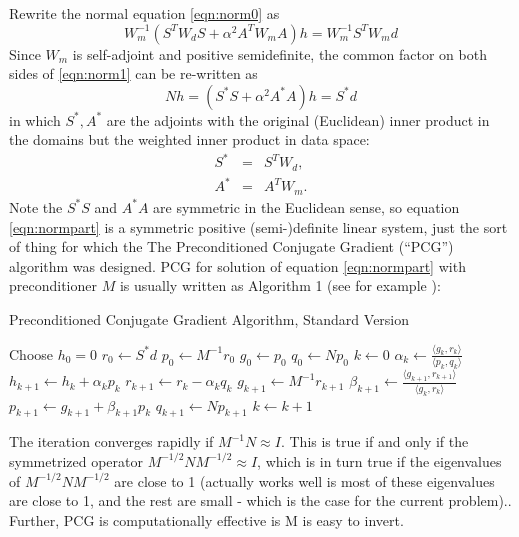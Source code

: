 \documentclass[georeport,12pt]{geophysics}
\begin{document}
Rewrite the normal equation \ref{eqn:norm0} as
\begin{equation}
  \label{eqn:norm1}
  W_m^{-1}(S^TW_dS + \alpha^2 A^TW_mA)h = W_m^{-1}S^TW_md 
\end{equation}
Since $W_m$ is self-adjoint and positive semidefinite, the common factor on both sides of \ref{eqn:norm1} can be re-written as
\begin{equation}
  \label{eqn:normpart}
  Nh = (S^*S + \alpha^2 A^*A)h = S^*d 
\end{equation}
in which $S^*, A^*$ are the adjoints with the original (Euclidean)
inner product in the domains but the weighted inner product in data
space:
\begin{eqnarray}
  \label{eqn:sadjwt}
  S^* &=& S^T W_d,\\
  A^* &=& A^T W_m.
\end{eqnarray}
Note the $S^*S$ and $A^*A$ are symmetric in the Euclidean sense, so
equation \ref{eqn:normpart} is a symmetric positive (semi-)definite
linear system, just the sort of thing for which the 
The Preconditioned Conjugate Gradient (``PCG'') algorithm was
designed. PCG for solution
of equation \ref{eqn:normpart} with preconditioner $M$ is usually
written as Algorithm 1 (see for example \cite{Golub:2012}):

\begin{algorithm}[H]
\caption{Preconditioned Conjugate Gradient Algorithm, Standard Version}
\begin{algorithmic}[1]
\State Choose $h_0=0$ 
  \State $r_0 \gets S^*d$
  \State $p_0 \gets M^{-1} r_0$
  \State $g_0 \gets p_0$
  \State $q_0 \gets Np_0$
  \State $k \gets 0$
  \Repeat
  \State $\alpha_k \gets \frac{\langle g_k,r_k \rangle}{\langle p_k,q_k\rangle}$
  \State $h_{k+1} \gets h_k + \alpha_k p_k$
  \State $r_{k+1} \gets r_k - \alpha_kq_k$
  \State $g_{k+1} \gets M^{-1} r_{k+1}$
  \State $\beta_{k+1} \gets \frac{\langle g_{k+1},r_{k+1}\rangle}{\langle g_k,r_k\rangle}$
  \State $p_{k+1}\gets g_{k+1}+\beta_{k+1}p_k$
  \State $q_{k+1} \gets Np_{k+1}$
  \State $k \gets k+1$
\end{algorithmic}
\end{algorithm}
The iteration converges rapidly if $M^{-1}N \approx I$. This is true
if and only if the symmetrized operator $M^{-1/2}NM^{-1/2} \approx I$,
which is in turn true if the eigenvalues of $M^{-1/2}NM^{-1/2}$ are
close to 1 (actually works well is most of these eigenvalues are close
to 1, and the rest are small - which is the case for the current
problem)..  Further, PCG is computationally effective is M is easy to
invert.
\end{document}

